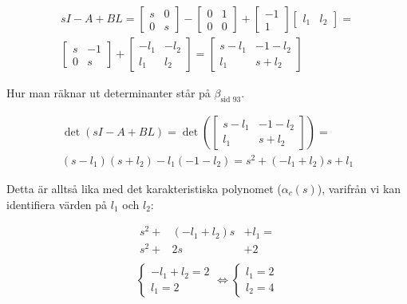 \documentclass[a4paper]{article}
\newcommand{\mhb}[1]{$\beta_{\text{#1}}$}     %
\begin{document}
\begin{align*}
  sI - A + BL = \begin{bmatrix}s & 0 \\ 0 & s\end{bmatrix} - \begin{bmatrix}0 & 1 \\ 0 & 0\end{bmatrix} + \begin{bmatrix}-1 \\ 1\end{bmatrix}\begin{bmatrix}l_1 & l_2\end{bmatrix} = \\
  \begin{bmatrix}s & -1 \\ 0 & s\end{bmatrix} + \begin{bmatrix}-l_1 & -l_2 \\ l_1 & l_2\end{bmatrix} = \begin{bmatrix}s - l_1 & -1 -l_2 \\ l_1 & s + l_2\end{bmatrix}
\end{align*}

Hur man räknar ut determinanter står på \mhb{sid 93}.

\begin{align*}
  \det(sI - A + BL) = \det \left( \begin{bmatrix}s - l_1 & -1 -l_2 \\ l_1 & s + l_2\end{bmatrix} \right) = \\
  (s - l_1)(s + l_2) - l_1(-1 -l_2) = s^2 + (-l_1 + l_2)s + l_1
\end{align*}

Detta är alltså lika med det karakteristiska polynomet ($\alpha_c(s)$), varifrån vi kan identifiera värden på $l_1$ och $l_2$:

\begin{eqnarray*}
  s^2 + &(-l_1 + l_2)s &+ l_1 = \\
  s^2 + &2s &+ 2\\
\end{eqnarray*}
\vspace{-10mm}
\begin{align*}
  \left\{ \begin{array}{ll}
  -l_1 + l_2 = 2\\
  l_1 = 2
  \end{array} \right. \Longleftrightarrow
  \left\{ \begin{array}{ll}
  l_1 = 2\\
  l_2 = 4
  \end{array} \right.
\end{align*}
\end{document}
